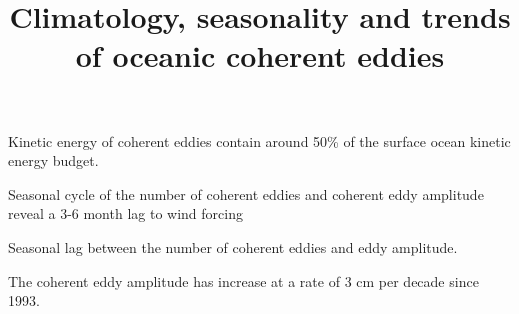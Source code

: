 \documentclass[draft,linenumbers]{agujournal2019}
\begin{document}
\title{Climatology, seasonality and trends of oceanic coherent eddies}



\begin{keypoints}
	\item Kinetic energy of coherent eddies 
	contain around 50\% of the 
	surface ocean kinetic energy budget.
	\item Seasonal cycle of the number of coherent eddies and 
	coherent eddy amplitude reveal a 3-6 month lag to wind forcing
	\item Seasonal lag between the number of coherent eddies and eddy amplitude.
	\item The coherent eddy amplitude has increase at 
	a rate of 3 cm per decade since 1993.
\end{keypoints}
\end{document}
